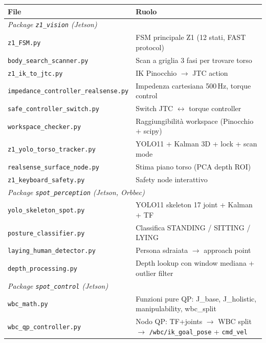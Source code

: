 \documentclass[a4paper,11pt]{article}
\begin{document}
\begin{center}
\begin{longtable}{lp{8.5cm}}
\toprule
\textbf{File} & \textbf{Ruolo} \\
\midrule
\endhead
\multicolumn{2}{l}{\textit{Package \texttt{z1\_vision} (Jetson)}} \\
\midrule
\texttt{z1\_FSM.py}                        & FSM principale Z1 (12 stati, FAST protocol) \\
\texttt{body\_search\_scanner.py}          & Scan a griglia 3 fasi per trovare torso \\
\texttt{z1\_ik\_to\_jtc.py}                & IK Pinocchio $\to$ JTC action \\
\texttt{impedance\_controller\_realsense.py}& Impedenza cartesiana 500\,Hz, torque control \\
\texttt{safe\_controller\_switch.py}        & Switch JTC $\leftrightarrow$ torque controller \\
\texttt{workspace\_checker.py}             & Raggiungibilità workspace (Pinocchio + scipy) \\
\texttt{z1\_yolo\_torso\_tracker.py}        & YOLO11 + Kalman 3D + lock + scan mode \\
\texttt{realsense\_surface\_node.py}        & Stima piano torso (PCA depth ROI) \\
\texttt{z1\_keyboard\_safety.py}           & Safety node interattivo \\
\midrule
\multicolumn{2}{l}{\textit{Package \texttt{spot\_perception} (Jetson, Orbbec)}} \\
\midrule
\texttt{yolo\_skeleton\_spot.py}            & YOLO11 skeleton 17 joint + Kalman + TF \\
\texttt{posture\_classifier.py}            & Classifica STANDING / SITTING / LYING \\
\texttt{laying\_human\_detector.py}        & Persona sdraiata $\to$ approach point \\
\texttt{depth\_processing.py}              & Depth lookup con window mediana + outlier filter \\
\midrule
\multicolumn{2}{l}{\textit{Package \texttt{spot\_control} (Jetson)}} \\
\midrule
\texttt{wbc\_math.py}                      & Funzioni pure QP: J\_base, J\_holistic,
                                             manipulability, wbc\_split \\
\texttt{wbc\_qp\_controller.py}            & Nodo QP: TF+joints $\to$ WBC split $\to$
                                             \texttt{/wbc/ik\_goal\_pose} + \texttt{cmd\_vel} \\

\end{longtable}
\end{center}
\end{document}

